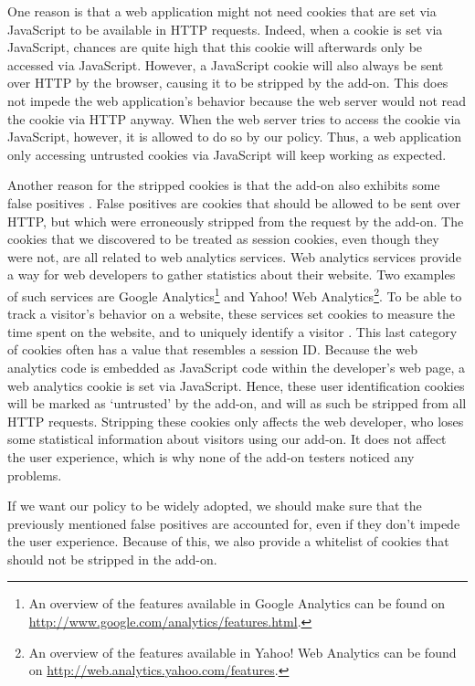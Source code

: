 One reason is that a web application might not need cookies that are set via JavaScript to be available in HTTP requests. Indeed, when a cookie is set via JavaScript, chances are quite high that this cookie will afterwards only be accessed via JavaScript. However, a JavaScript cookie will also always be sent over HTTP by the browser, causing it to be stripped by the add-on. This does not impede the web application's behavior because the web server would not read the cookie via HTTP anyway. When the web server tries to access the cookie via JavaScript, however, it is allowed to do so by our policy. Thus, a web application only accessing untrusted cookies via JavaScript will keep working as expected.

Another reason for the stripped cookies is that the add-on also exhibits some false positives \cite{Bonne2011}. False positives are cookies that should be allowed to be sent over HTTP, but which were erroneously stripped from the request by the add-on. The cookies that we discovered to be treated as session cookies, even though they were not, are all related to web analytics services. Web analytics services provide a way for web developers to gather statistics about their website. Two examples of such services are Google Analytics\footnote{An overview of the features available in Google Analytics can be found on \url{http://www.google.com/analytics/features.html}.} and Yahoo! Web Analytics\footnote{An overview of the features available in Yahoo! Web Analytics can be found on \url{http://web.analytics.yahoo.com/features}.}. To be able to track a visitor's behavior on a website, these services set cookies to measure the time spent on the website, and to uniquely identify a visitor \cite{Tappenden2009,GoogleAnalytics}. This last category of cookies often has a value that resembles a session ID. Because the web analytics code is embedded as JavaScript code within the developer's web page, a web analytics cookie is set via JavaScript. Hence, these user identification cookies will be marked as `untrusted' by the add-on, and will as such be stripped from all HTTP requests. Stripping these cookies only affects the web developer, who loses some statistical information about visitors using our add-on. It does not affect the user experience, which is why none of the add-on testers noticed any problems.

If we want our policy to be widely adopted, we should make sure that the previously mentioned false positives are accounted for, even if they don't impede the user experience. Because of this, we also provide a whitelist of cookies that should not be stripped in the add-on.

